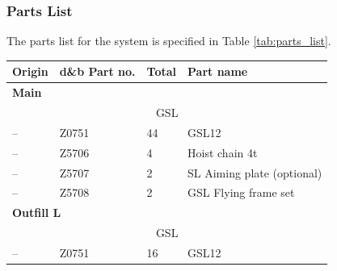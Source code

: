     \subsubsection{Parts List}
        The parts list for the system is specified in Table \ref{tab:parts_list}.

        \begin{longtable}[H]{|llll|}
            \hline
            \multicolumn{1}{|l|}{\textbf{Origin}} & \multicolumn{1}{l|}{\textbf{d\&b Part no.}} & \multicolumn{1}{l|}{\textbf{Total}} & \textbf{Part name}         \\ \hline
            \endfirsthead
            \endhead
            \multicolumn{4}{|l|}{\textbf{Main}}                                                                                                                    \\ \hline
            \multicolumn{4}{|c|}{GSL}                                                                                                                              \\ \hline
            \multicolumn{1}{|l|}{--}              & \multicolumn{1}{l|}{Z0751}                  & \multicolumn{1}{l|}{44}             & GSL12                      \\ \hline
            \multicolumn{1}{|l|}{--}              & \multicolumn{1}{l|}{Z5706}                  & \multicolumn{1}{l|}{4}              & Hoist chain 4t             \\ \hline
            \multicolumn{1}{|l|}{--}              & \multicolumn{1}{l|}{Z5707}                  & \multicolumn{1}{l|}{2}              & SL Aiming plate (optional) \\ \hline
            \multicolumn{1}{|l|}{--}              & \multicolumn{1}{l|}{Z5708}                  & \multicolumn{1}{l|}{2}              & GSL Flying frame set       \\ \hline
            \multicolumn{4}{|l|}{\textbf{Outfill L}}                                                                                                               \\ \hline
            \multicolumn{4}{|c|}{GSL}                                                                                                                              \\ \hline
            \multicolumn{1}{|l|}{--}              & \multicolumn{1}{l|}{Z0751}                  & \multicolumn{1}{l|}{16}             & GSL12                      \\ \hline

\end{longtable}
